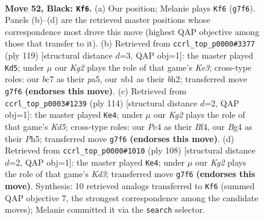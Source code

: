 \documentclass[11pt]{article}
\begin{document}
\clearpage

\begin{figure}[p]\centering
\begin{subfigure}{0.46\textwidth}\centering
\resizebox{\linewidth}{!}{%
\newchessgame
\chessboard[
  setfen={8/2B3k1/p7/8/2p3b1/8/5K2/1N6 b - - 3 52},
  showmover=false,
  pgfstyle=straightmove, color=movearrow, markmove={g7-f6}
]}
\caption{}
\end{subfigure}\hfill
\begin{subfigure}{0.46\textwidth}\centering
\resizebox{\linewidth}{!}{%
\newchessgame
\chessboard[
  setfen={8/8/p1b1k3/P7/8/4K2p/7B/8 b - - 3 60},
  showmover=false,
  pgfstyle=straightmove, color=movearrow, markmove={e6-d5}
]}
\caption{}
\end{subfigure}
\\[4pt]
\begin{subfigure}{0.46\textwidth}\centering
\resizebox{\linewidth}{!}{%
\newchessgame
\chessboard[
  setfen={3b4/5k2/8/3K3P/5B2/7P/8/8 w - - 6 58},
  showmover=false,
  pgfstyle=straightmove, color=movearrow, markmove={d5-e4}
]}
\caption{}
\end{subfigure}\hfill
\begin{subfigure}{0.46\textwidth}\centering
\resizebox{\linewidth}{!}{%
\newchessgame
\chessboard[
  setfen={8/6k1/8/8/5PPb/3K4/B7/8 w - - 1 55},
  showmover=false,
  pgfstyle=straightmove, color=movearrow, markmove={d3-e4}
]}
\caption{}
\end{subfigure}
\caption{\textbf{Move 52, Black: \texttt{Kf6}.} (a) Our position; Melanie plays \texttt{Kf6} (\texttt{g7f6}). Panels (b)--(d) are the retrieved master positions whose correspondence most drove this move (highest QAP objective among those that transfer to it). (b) Retrieved from \texttt{ccrl\_top\_p0000\#3377} (ply 119) [structural distance $d$=3, QAP obj=1]: the master played \texttt{Kd5}; under $\mu$ our \emph{Kg2} plays the role of that game's \emph{Ke3}; cross-type roles: our \emph{b}c7 as their \emph{p}a5, our \emph{n}b1 as their \emph{b}h2; transferred move \texttt{g7f6} \textbf{(endorses this move)}. (c) Retrieved from \texttt{ccrl\_top\_p0003\#1239} (ply 114) [structural distance $d$=2, QAP obj=1]: the master played \texttt{Ke4}; under $\mu$ our \emph{Kg2} plays the role of that game's \emph{Kd5}; cross-type roles: our \emph{P}c4 as their \emph{B}f4, our \emph{B}g4 as their \emph{P}h5; transferred move \texttt{g7f6} \textbf{(endorses this move)}. (d) Retrieved from \texttt{ccrl\_top\_p0000\#1010} (ply 108) [structural distance $d$=2, QAP obj=1]: the master played \texttt{Ke4}; under $\mu$ our \emph{Kg2} plays the role of that game's \emph{Kd3}; transferred move \texttt{g7f6} \textbf{(endorses this move)}. Synthesis: 10 retrieved analogs transferred to \texttt{Kf6} (summed QAP objective 7, the strongest correspondence among the candidate moves); Melanie committed it via the \texttt{search} selector.}
\label{fig:thought-m103}
\end{figure}
\end{document}
